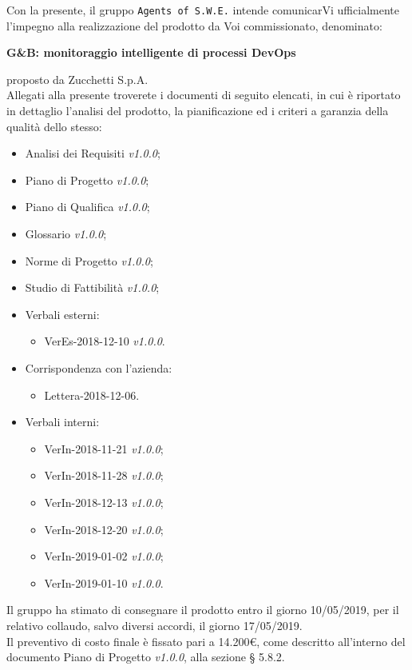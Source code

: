 \documentclass[11pt, a4paper]{letter} %
\begin{document}
\begin{letter}
Con la presente, il gruppo \texttt{Agents of S.W.E.} intende comunicarVi ufficialmente l'impegno alla realizzazione del prodotto da Voi commissionato, denominato:
\begin{center}
	\textbf{G\&B: monitoraggio intelligente di processi DevOps}
\end{center}
proposto da Zucchetti S.p.A.\\
Allegati alla presente troverete i documenti di seguito elencati, in cui è riportato in dettaglio l'analisi del prodotto, la pianificazione ed i criteri a garanzia della qualità dello stesso:
\begin{itemize}
	\item Analisi dei Requisiti \textit{v1.0.0};
	\item Piano di Progetto \textit{v1.0.0};
	\item Piano di Qualifica \textit{v1.0.0};
	\item Glossario \textit{v1.0.0};
	\item Norme di Progetto \textit{v1.0.0};	
	\item Studio di Fattibilità \textit{v1.0.0};
	\item Verbali esterni: 
		\begin{itemize}
			\item VerEs-2018-12-10 \textit{v1.0.0}.
		\end{itemize}
	\item Corrispondenza con l'azienda: 
		\begin{itemize}
			\item Lettera-2018-12-06.
		\end{itemize}
	\item Verbali interni: 
		\begin{itemize}
			\item VerIn-2018-11-21 \textit{v1.0.0};
			\item VerIn-2018-11-28 \textit{v1.0.0};
			\item VerIn-2018-12-13 \textit{v1.0.0};
			\item VerIn-2018-12-20 \textit{v1.0.0};
			\item VerIn-2019-01-02 \textit{v1.0.0};
			\item VerIn-2019-01-10 \textit{v1.0.0}.
		\end{itemize}
\end{itemize}
Il gruppo ha stimato di consegnare il prodotto entro il giorno 10/05/2019, per il relativo collaudo, salvo diversi accordi, il giorno 17/05/2019.\\  
Il preventivo di costo finale è fissato pari a 14.200€, come descritto all'interno del documento Piano di Progetto \textit{v1.0.0}, alla sezione § 5.8.2.\\

\end{letter}
\end{document}
